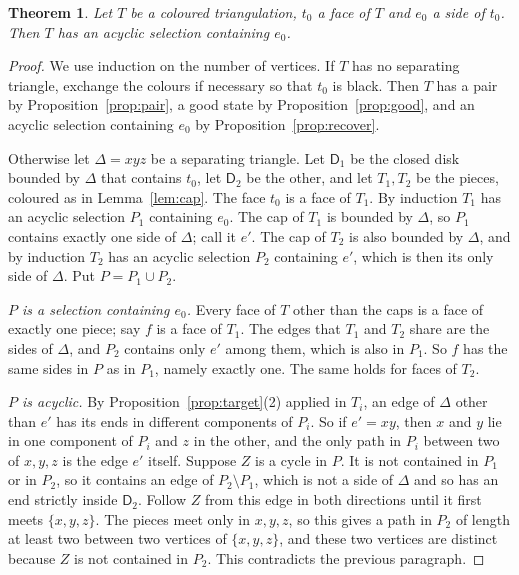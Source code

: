 \documentclass[10pt]{amsart}
\numberwithin{equation}{section}
\newtheorem{theorem}[equation]{Theorem}
\theoremstyle{definition}
\theoremstyle{remark}
\newcommand{\T}{T}
\begin{document}
\begin{theorem}\label{thm:T}
Let $\T$ be a coloured triangulation, $t_0$ a face of $\T$ and $e_0$ a side of $t_0$.
Then $\T$ has an acyclic selection containing $e_0$.
\end{theorem}

\begin{proof}
We use induction on the number of vertices.
If $\T$ has no separating triangle, exchange the colours if necessary so that $t_0$ is black.
Then $\T$ has a pair by Proposition~\ref{prop:pair}, a good state by Proposition~\ref{prop:good}, and an acyclic selection containing $e_0$ by Proposition~\ref{prop:recover}.

Otherwise let $\Delta=xyz$ be a separating triangle.
Let $\mathsf{D}_1$ be the closed disk bounded by $\Delta$ that contains $t_0$, let $\mathsf{D}_2$ be the other, and let $\T_1,\T_2$ be the pieces, coloured as in Lemma~\ref{lem:cap}.
The face $t_0$ is a face of $\T_1$.
By induction $\T_1$ has an acyclic selection $P_1$ containing $e_0$.
The cap of $\T_1$ is bounded by $\Delta$, so $P_1$ contains exactly one side of $\Delta$; call it $e'$.
The cap of $\T_2$ is also bounded by $\Delta$, and by induction $\T_2$ has an acyclic selection $P_2$ containing $e'$, which is then its only side of $\Delta$.
Put $P=P_1\cup P_2$.

\emph{$P$ is a selection containing $e_0$.}
Every face of $\T$ other than the caps is a face of exactly one piece; say $f$ is a face of $\T_1$.
The edges that $\T_1$ and $\T_2$ share are the sides of $\Delta$, and $P_2$ contains only $e'$ among them, which is also in $P_1$.
So $f$ has the same sides in $P$ as in $P_1$, namely exactly one.
The same holds for faces of $\T_2$.

\emph{$P$ is acyclic.}
By Proposition~\ref{prop:target}(2) applied in $\T_i$, an edge of $\Delta$ other than $e'$ has its ends in different components of $P_i$.
So if $e'=xy$, then $x$ and $y$ lie in one component of $P_i$ and $z$ in the other, and the only path in $P_i$ between two of $x,y,z$ is the edge $e'$ itself.
Suppose $Z$ is a cycle in $P$.
It is not contained in $P_1$ or in $P_2$, so it contains an edge of $P_2\setminus P_1$, which is not a side of $\Delta$ and so has an end strictly inside $\mathsf{D}_2$.
Follow $Z$ from this edge in both directions until it first meets $\{x,y,z\}$.
The pieces meet only in $x,y,z$, so this gives a path in $P_2$ of length at least two between two vertices of $\{x,y,z\}$, and these two vertices are distinct because $Z$ is not contained in $P_2$.
This contradicts the previous paragraph.
\end{proof}
\end{document}
